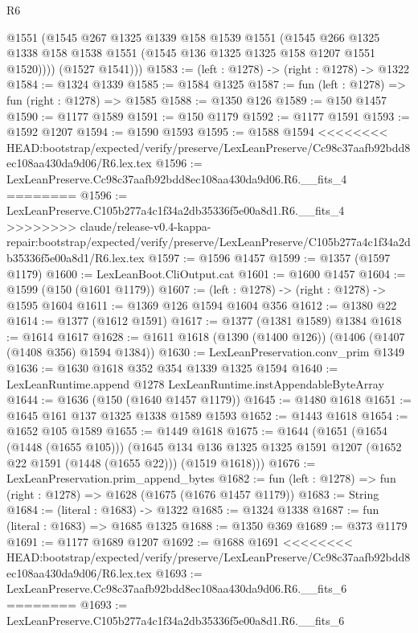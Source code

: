 \begin{lexlean}{R6}
\begin{coremodule}
{{{{{{{{{{{{{{{{{{{{{{{{{{{{{{{{{{{{{{{{{{{{{{{{{{          @1551
          (@1545
            @267
            @1325
            @1339
            @158
            @1539
            @1551
            (@1545
              @266
              @1325
              @1338
              @158
              @1538
              @1551
              (@1545 @136 @1325 @1325 @158 @1207 @1551 @1520))))
        (@1527 @1541)))
@1583 := (left : @1278) -> (right : @1278) -> @1322
@1584 := @1324 @1339
@1585 := @1584 @1325
@1587 := fun (left : @1278) => fun (right : @1278) => @1585
@1588 := @1350 @126
@1589 := @150 @1457
@1590 := @1177 @1589
@1591 := @150 @1179
@1592 := @1177 @1591
@1593 := @1592 @1207
@1594 := @1590 @1593
@1595 := @1588 @1594
<<<<<<<< HEAD:bootstrap/expected/verify/preserve/LexLeanPreserve/Cc98c37aafb92bdd8ec108aa430da9d06/R6.lex.tex
@1596 := LexLeanPreserve.Cc98c37aafb92bdd8ec108aa430da9d06.R6.__fits_4
========
@1596 := LexLeanPreserve.C105b277a4c1f34a2db35336f5e00a8d1.R6.__fits_4
>>>>>>>> claude/release-v0.4-kappa-repair:bootstrap/expected/verify/preserve/LexLeanPreserve/C105b277a4c1f34a2db35336f5e00a8d1/R6.lex.tex
@1597 := @1596 @1457
@1599 := @1357 (@1597 @1179)
@1600 := LexLeanBoot.CliOutput.cat
@1601 := @1600 @1457
@1604 := @1599 (@150 (@1601 @1179))
@1607 := (left : @1278) -> (right : @1278) -> @1595 @1604
@1611 := @1369 @126 @1594 @1604 @356
@1612 := @1380 @22
@1614 := @1377 (@1612 @1591)
@1617 := @1377 (@1381 @1589) @1384
@1618 := @1614 @1617
@1628 := @1611 @1618 (@1390 (@1400 @126)) (@1406 (@1407 (@1408 @356) @1594 @1384))
@1630 := LexLeanPreservation.conv_prim @1349
@1636 := @1630 @1618 @352 @354 @1339 @1325 @1594
@1640 := LexLeanRuntime.append @1278 LexLeanRuntime.instAppendableByteArray
@1644 := @1636 (@150 (@1640 @1457 @1179))
@1645 := @1480 @1618
@1651 := @1645 @161 @137 @1325 @1338 @1589 @1593
@1652 := @1443 @1618
@1654 := @1652 @105 @1589
@1655 := @1449 @1618
@1675 := @1644
    (@1651
      (@1654 (@1448 (@1655 @105)))
      (@1645 @134 @136 @1325 @1325 @1591 @1207 (@1652 @22 @1591 (@1448 (@1655 @22))) (@1519 @1618)))
@1676 := LexLeanPreservation.prim_append_bytes
@1682 := fun (left : @1278) => fun (right : @1278) => @1628 (@1675 (@1676 @1457 @1179))
@1683 := String
@1684 := (literal : @1683) -> @1322
@1685 := @1324 @1338
@1687 := fun (literal : @1683) => @1685 @1325
@1688 := @1350 @369
@1689 := @373 @1179
@1691 := @1177 @1689 @1207
@1692 := @1688 @1691
<<<<<<<< HEAD:bootstrap/expected/verify/preserve/LexLeanPreserve/Cc98c37aafb92bdd8ec108aa430da9d06/R6.lex.tex
@1693 := LexLeanPreserve.Cc98c37aafb92bdd8ec108aa430da9d06.R6.__fits_6
========
@1693 := LexLeanPreserve.C105b277a4c1f34a2db35336f5e00a8d1.R6.__fits_6
}}}}}}}}}}}}}}}}}}}}}}}}}}}}}}}}}}}}}}}}}}}}}}}}}}
\end{coremodule}
\end{lexlean}
